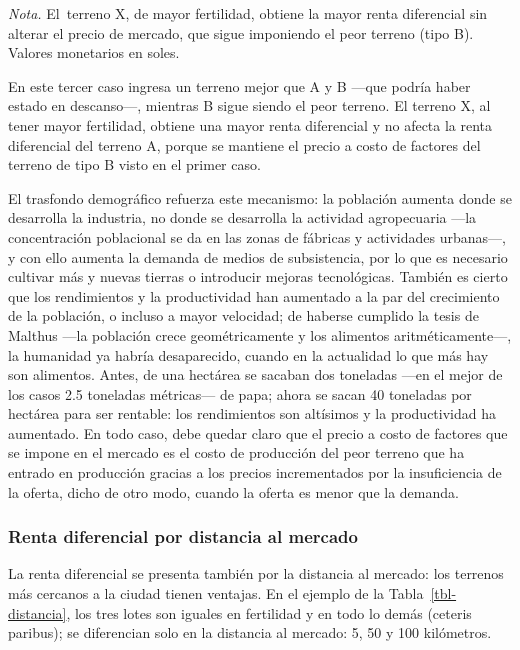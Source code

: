 \documentclass[
  man,
  floatsintext,
  longtable,
  a4paper,
  nolmodern,
  notxfonts,
  notimes,
  12pt,
  colorlinks=true,linkcolor=blue,citecolor=blue,urlcolor=blue]{apa7}
\begin{document}
\begin{table}
\vspace{-20pt}
\noindent \emph{Nota.} El~terreno X, de mayor fertilidad, obtiene la
mayor renta diferencial sin alterar el precio de mercado, que sigue
imponiendo el peor terreno (tipo B). Valores monetarios en soles.

\end{table}

En este tercer caso ingresa un terreno mejor que A y B ---que podría
haber estado en descanso---, mientras B sigue siendo el peor terreno. El
terreno X, al tener mayor fertilidad, obtiene una mayor renta
diferencial y no afecta la renta diferencial del terreno A, porque se
mantiene el precio a costo de factores del terreno de tipo B visto en el
primer caso.

El trasfondo demográfico refuerza este mecanismo: la población aumenta
donde se desarrolla la industria, no donde se desarrolla la actividad
agropecuaria ---la concentración poblacional se da en las zonas de
fábricas y actividades urbanas---, y con ello aumenta la demanda de
medios de subsistencia, por lo que es necesario cultivar más y nuevas
tierras o introducir mejoras tecnológicas. También es cierto que los
rendimientos y la productividad han aumentado a la par del crecimiento
de la población, o incluso a mayor velocidad; de haberse cumplido la
tesis de Malthus ---la población crece geométricamente y los alimentos
aritméticamente---, la humanidad ya habría desaparecido, cuando en la
actualidad lo que más hay son alimentos. Antes, de una hectárea se
sacaban dos toneladas ---en el mejor de los casos 2.5 toneladas
métricas--- de papa; ahora se sacan 40 toneladas por hectárea para ser
rentable: los rendimientos son altísimos y la productividad ha
aumentado. En todo caso, debe quedar claro que el precio a costo de
factores que se impone en el mercado es el costo de producción del peor
terreno que ha entrado en producción gracias a los precios incrementados
por la insuficiencia de la oferta, dicho de otro modo, cuando la oferta
es menor que la demanda.

\subsubsection{Renta diferencial por distancia al
mercado}\label{renta-diferencial-por-distancia-al-mercado}

La renta diferencial se presenta también por la distancia al mercado:
los terrenos más cercanos a la ciudad tienen ventajas. En el ejemplo de
la Tabla~\ref{tbl-distancia}, los tres lotes son iguales en fertilidad y
en todo lo demás (ceteris paribus); se diferencian solo en la distancia
al mercado: 5, 50 y 100 kilómetros.
\end{document}
